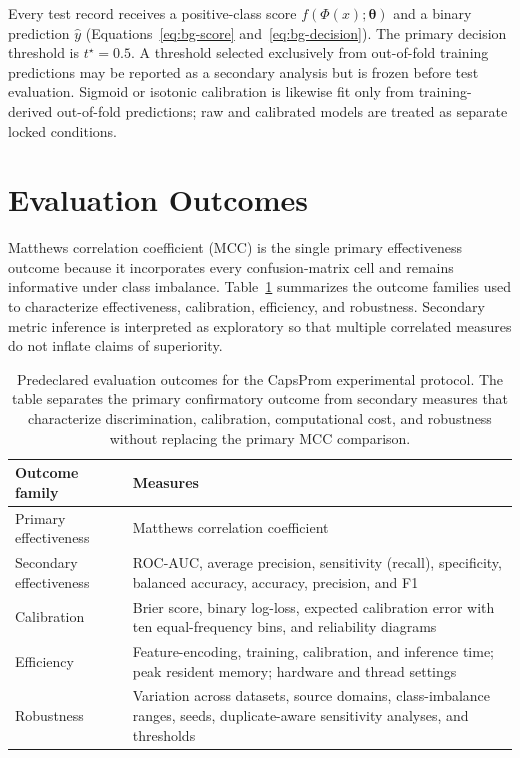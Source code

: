 Every test record receives a positive-class score $f(\Phi(x);\boldsymbol{\theta})$ and a binary
prediction $\hat y$ (Equations~\eqref{eq:bg-score} and~\eqref{eq:bg-decision}).
The primary decision threshold is $t^{\star}=0.5$. A threshold selected exclusively from
out-of-fold training predictions may be reported as a secondary analysis but is
frozen before test evaluation. Sigmoid or isotonic calibration is likewise fit
only from training-derived out-of-fold predictions; raw and calibrated models
are treated as separate locked conditions.

\section{Evaluation Outcomes}\label{sec:protocol-metrics}

Matthews correlation coefficient (MCC) is the single primary effectiveness
outcome because it incorporates every confusion-matrix cell and remains
informative under class imbalance. Table~\ref{tab:protocol-outcomes} summarizes
the outcome families used to characterize effectiveness, calibration,
efficiency, and robustness. Secondary metric inference is interpreted as
exploratory so that multiple correlated measures do not inflate claims of
superiority.

\begin{table}[htbp]
  \centering
  \caption{Predeclared evaluation outcomes for the CapsProm experimental
  protocol. The table separates the primary confirmatory outcome from secondary
  measures that characterize discrimination, calibration, computational cost,
  and robustness without replacing the primary MCC comparison.}
  \label{tab:protocol-outcomes}
  \begin{tabular}{p{}p{}}
    \toprule
    Outcome family & Measures \\
    \midrule
    Primary effectiveness & Matthews correlation coefficient \\
    Secondary effectiveness & ROC-AUC, average precision, sensitivity (recall),
    specificity, balanced accuracy, accuracy, precision, and F1 \\
    Calibration & Brier score, binary log-loss, expected calibration error with
    ten equal-frequency bins, and reliability diagrams \\
    Efficiency & Feature-encoding, training, calibration, and inference time;
    peak resident memory; hardware and thread settings \\
    Robustness & Variation across datasets, source domains, class-imbalance
    ranges, seeds, duplicate-aware sensitivity analyses, and thresholds \\
    \bottomrule
  \end{tabular}
\end{table}

